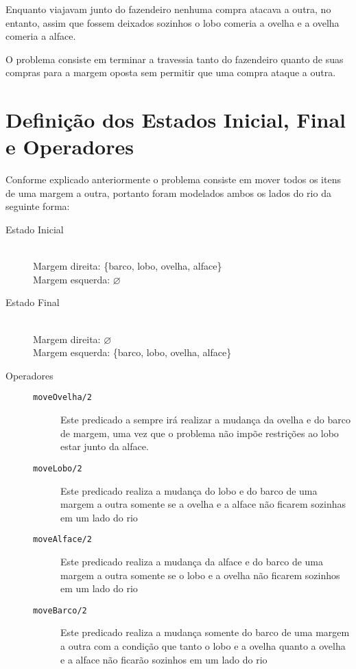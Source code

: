 \documentclass[brazil,times]{abnt}
\begin{document}
	Enquanto viajavam junto do fazendeiro nenhuma compra atacava a outra, no
	entanto, assim que fossem deixados sozinhos o lobo comeria a ovelha e a
	ovelha comeria a alface.
	
	O problema consiste em terminar a travessia tanto do fazendeiro
	quanto de suas compras para a margem oposta sem permitir que uma compra ataque
	a outra. \cite{ptwiki:problema-lobo-ovelha-alface}

\section*{Definição dos Estados Inicial, Final e Operadores}
	Conforme explicado anteriormente o problema consiste em mover todos os itens de
	uma margem a outra, portanto foram modelados ambos os lados do rio da seguinte
	forma:
	
	\begin{description}
		\item[Estado Inicial] \hfill \\
		Margem direita: \{barco, lobo, ovelha, alface\} \\
		Margem esquerda: $\varnothing$
		\item[Estado Final] \hfill \\
		Margem direita: $\varnothing$ \\
		Margem esquerda: \{barco, lobo, ovelha, alface\}
		\item[Operadores] \hfill
			\begin{description}
				\item[\texttt{moveOvelha/2}] Este predicado a sempre irá realizar a
				mudança da ovelha e do barco de margem, uma vez que o problema não
				impõe restrições ao lobo estar junto da alface.
				\item[\texttt{moveLobo/2}] Este predicado realiza a mudança do lobo e do
				barco de uma margem a outra somente se a ovelha e a alface não ficarem
				sozinhas em um lado do rio
				\item[\texttt{moveAlface/2}] Este predicado realiza a mudança da alface e do
				barco de uma margem a outra somente se o lobo e a ovelha não ficarem
				sozinhos em um lado do rio 
				\item[\texttt{moveBarco/2}] Este predicado realiza a mudança somente do
				barco de uma margem a outra com a condição que tanto o lobo e a ovelha
				quanto a ovelha e a alface não ficarão sozinhos em um lado do rio 
			\end{description}
	\end{description}
\end{document}
